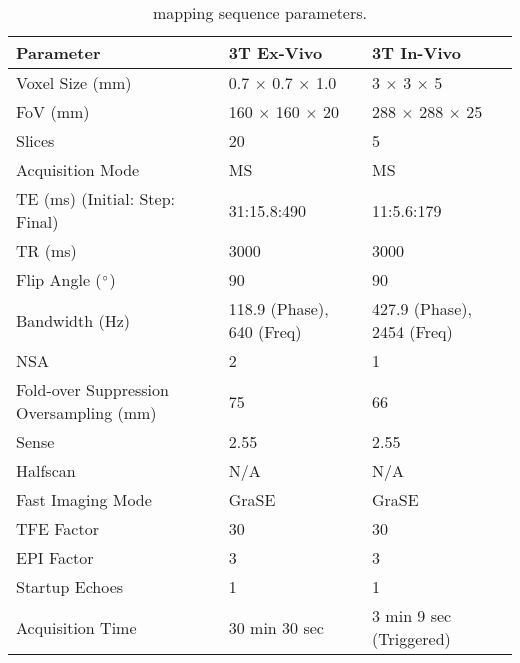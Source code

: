 \begin{table}[H]
	\centering
	\begin{tabularx}{1.0\textwidth}{X|X|X}
	\textbf{Parameter}                      & \textbf{3T Ex-Vivo} & \textbf{3T In-Vivo} \\ \hline
	Voxel Size (mm)                         & 0.7 $\times$ 0.7 $\times$ 1.0     & 3 $\times$ 3 $\times$ 5           \\ \hline
	FoV (mm)                                & 160 $\times$ 160 $\times$ 20      & 288 $\times$ 288 $\times$ 25      \\ \hline
	Slices                                  & 20                  & 5                   \\ \hline
	Acquisition Mode                        & MS                  & MS                  \\ \hline
	TE (ms) (Initial: Step: Final)          & 31:15.8:490         & 11:5.6:179          \\ \hline
	TR (ms)                                 & 3000                & 3000                \\ \hline
	Flip Angle ($\degree$)                  & 90                  & 90                  \\ \hline
	Bandwidth (Hz)                          & 118.9 (Phase), 640 (Freq) & 427.9 (Phase), 2454 (Freq)              \\ \hline
	NSA                                     & 2                   & 1                   \\ \hline
	Fold-over Suppression Oversampling (mm) & 75                  & 66                  \\ \hline
	Sense                                   & 2.55                & 2.55                \\ \hline
	Halfscan                                & N/A                 & N/A                 \\ \hline
	Fast Imaging Mode                       & GraSE               & GraSE               \\ \hline
	TFE Factor                              & 30                  & 30                  \\ \hline
	EPI Factor                              & 3                   & 3                   \\ \hline
	Startup Echoes                          & 1                   & 1                   \\ \hline
	Acquisition Time                        & 30 min 30 sec       & 3 min 9 sec (Triggered) 
	\end{tabularx}
	\caption{\ttwo mapping sequence parameters.}
	\label{tab:ex_t2_mapping}
\end{table}

